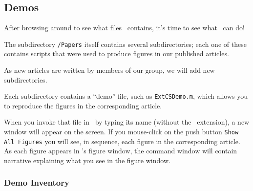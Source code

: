\documentclass{article}
\begin{document}





\subsection{Demos}

After browsing around to see what files \WaveLab\ contains,
it's time to see what \WaveLab\ can do!

The subdirectory {\tt \WLName /Papers} itself contains several subdirectories; each one of these
contains scripts that were used to produce figures in our published articles.

As new articles are written by members of our group, we will add new subdirectories.

Each subdirectory contains a ``demo'' file, such as {\tt ExtCSDemo.m}, which allows you to
reproduce the figures in the corresponding article.

When you invoke that file in \Matlab\ by typing its name (without the \dotm\ extension), a new
window will appear on the screen.  If you mouse-click on the push button {\tt Show All Figures} you
will see, in sequence, each figure in the corresponding article.  As each figure appears in
{\Matlab}'s figure window, the command window will contain narrative explaining what you see in the
figure window.


\subsubsection{Demo Inventory}
\end{document}
